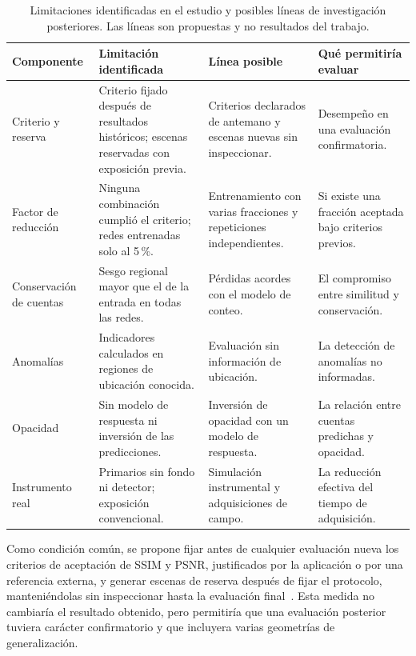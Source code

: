 \begin{table}[htbp]\centering\footnotesize
\caption[Limitaciones identificadas y posibles líneas de investigación]{Limitaciones identificadas en el estudio y posibles líneas de investigación posteriores. Las líneas son propuestas y no resultados del trabajo.}\label{tab:con-lineas}
\begin{tabularx}{\linewidth}{@{}>{\raggedright\arraybackslash}p{2.2cm}>{\raggedright\arraybackslash}X>{\raggedright\arraybackslash}X>{\raggedright\arraybackslash}X@{}}\toprule
Componente & Limitación identificada & Línea posible & Qué permitiría evaluar\\\midrule
Criterio y reserva & Criterio fijado después de resultados históricos; escenas reservadas con exposición previa. & Criterios declarados de antemano y escenas nuevas sin inspeccionar. & Desempeño en una evaluación confirmatoria.\\
Factor de reducción & Ninguna combinación cumplió el criterio; redes entrenadas solo al 5\,\%. & Entrenamiento con varias fracciones y repeticiones independientes. & Si existe una fracción aceptada bajo criterios previos.\\
Conservación de cuentas & Sesgo regional mayor que el de la entrada en todas las redes. & Pérdidas acordes con el modelo de conteo. & El compromiso entre similitud y conservación.\\
Anomalías & Indicadores calculados en regiones de ubicación conocida. & Evaluación sin información de ubicación. & La detección de anomalías no informadas.\\
Opacidad & Sin modelo de respuesta ni inversión de las predicciones. & Inversión de opacidad con un modelo de respuesta. & La relación entre cuentas predichas y opacidad.\\
Instrumento real & Primarios sin fondo ni detector; exposición convencional. & Simulación instrumental y adquisiciones de campo. & La reducción efectiva del tiempo de adquisición.\\\bottomrule
\end{tabularx}\end{table}

Como condición común, se propone fijar antes de cualquier evaluación nueva los criterios de aceptación de SSIM y PSNR, justificados por la aplicación o por una referencia externa, y generar escenas de reserva después de fijar el protocolo, manteniéndolas sin inspeccionar hasta la evaluación final~\parencite{kaufman2012}. Esta medida no cambiaría el resultado obtenido, pero permitiría que una evaluación posterior tuviera carácter confirmatorio y que incluyera varias geometrías de generalización.

